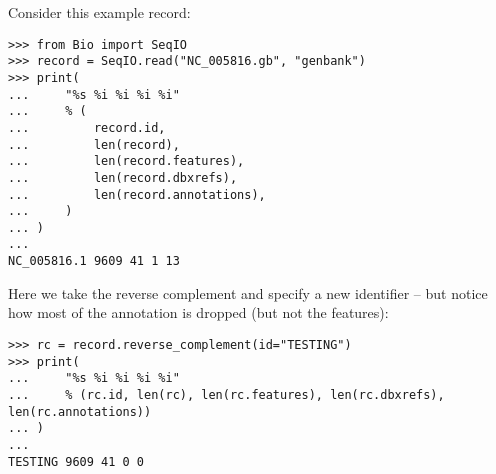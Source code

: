 Consider this example record:

\begin{verbatim}
>>> from Bio import SeqIO
>>> record = SeqIO.read("NC_005816.gb", "genbank")
>>> print(
...     "%s %i %i %i %i"
...     % (
...         record.id,
...         len(record),
...         len(record.features),
...         len(record.dbxrefs),
...         len(record.annotations),
...     )
... )
...
NC_005816.1 9609 41 1 13
\end{verbatim}

Here we take the reverse complement and specify a new identifier -- but notice
how most of the annotation is dropped (but not the features):

\begin{verbatim}
>>> rc = record.reverse_complement(id="TESTING")
>>> print(
...     "%s %i %i %i %i"
...     % (rc.id, len(rc), len(rc.features), len(rc.dbxrefs), len(rc.annotations))
... )
...
TESTING 9609 41 0 0
\end{verbatim}
